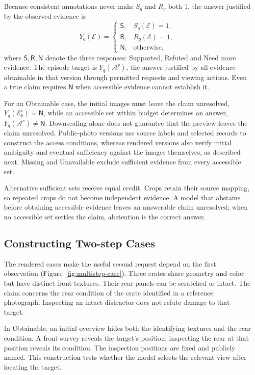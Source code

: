 \documentclass[10pt,twocolumn,letterpaper]{article}
\newcommand{\Spt}{\mathsf{S}}
\newcommand{\Rft}{\mathsf{R}}
\newcommand{\Nme}{\mathsf{N}}
\begin{document}
Because consistent annotations never make \(S_q\) and \(R_q\) both 1, the answer justified by the observed evidence is
\begin{equation}
Y_q(\mathcal{E})=
\begin{cases}
\Spt,& S_q(\mathcal{E})=1,\\
\Rft,& R_q(\mathcal{E})=1,\\
\Nme,& \text{otherwise},
\end{cases}
\label{eq:decision}
\end{equation}
where \(\Spt,\Rft,\Nme\) denote the three responses: Supported, Refuted and Need more evidence.
The episode target is \(Y_q(\mathcal{A}^v)\), the answer justified by all evidence obtainable in that version through permitted requests and viewing actions.
Even a true claim requires \(\Nme\) when accessible evidence cannot establish it.

For an Obtainable case, the initial images must leave the claim unresolved, \(Y_q(\mathcal{E}_0^v)=\Nme\), while an accessible set within budget determines an answer, \(Y_q(\mathcal{A}^v)\ne\Nme\).
Downscaling alone does not guarantee that the preview leaves the claim unresolved.
Public-photo versions use source labels and selected records to construct the access conditions, whereas rendered versions also verify initial ambiguity and eventual sufficiency against the images themselves, as described next.
Missing and Unavailable exclude sufficient evidence from every accessible set.

Alternative sufficient sets receive equal credit.
Crops retain their source mapping, so repeated crops do not become independent evidence.
A model that abstains before obtaining accessible evidence leaves an answerable claim unresolved; when no accessible set settles the claim, abstention is the correct answer.

\subsection{Constructing Two-step Cases}
\label{sec:two-step-construction}
The rendered cases make the useful second request depend on the first observation (Figure~\ref{fig:multistep-case}).
Three crates share geometry and color but have distinct front textures.
Their rear panels can be scratched or intact.
The claim concerns the rear condition of the crate identified in a reference photograph.
Inspecting an intact distractor does not refute damage to that target.

In Obtainable, an initial overview hides both the identifying textures and the rear condition.
A front survey reveals the target's position; inspecting the rear at that position reveals its condition.
The inspection positions are fixed and publicly named.
This construction tests whether the model selects the relevant view after locating the target.
\end{document}
